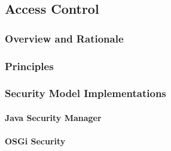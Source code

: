 \subsection{Access Control}

\subsubsection{Overview and Rationale}

\subsubsection{Principles}

\subsubsection{Security Model Implementations}

	\paragraph{Java Security Manager}
	
	\paragraph{OSGi Security}
	
	\cite{philippov2012security}